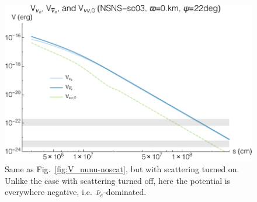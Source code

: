 \documentclass[aps,floatfix,prd,superscriptaddress,twocolumn]{revtex4-1}
\begin{document}
\begin{figure}
  \includegraphics[width=\columnwidth]{20170619-potentials-Vnue_Vnua_Vnu-000Mo-022deg-scat}
  \caption{Same as Fig.~\ref{fig:V_nunu-noscat},
    but with scattering turned on.
    Unlike the case with scattering turned off, here the potential is
    everywhere negative, i.e.\ $\bar{\nu}_e$-dominated.
    }
  \label{fig:V_nunu-scat}
\end{figure}
\end{document}

